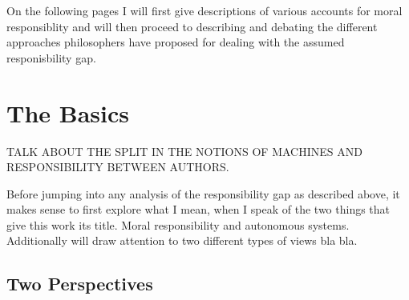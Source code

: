 \documentclass{article}
\begin{document}
On the following pages I will first give descriptions of various accounts for
moral responsiblity and will then proceed to describing and debating the
different approaches philosophers have proposed for dealing with the assumed
responisbility gap.

%
%
%
%
%
\newpage
\section{The Basics}

TALK ABOUT THE SPLIT IN THE NOTIONS OF MACHINES AND RESPONSIBILITY BETWEEN
AUTHORS.

Before jumping into any analysis of the responsibility gap as described above,
it makes sense to first explore what I mean, when I speak of the two things that
give this work its title. Moral responsibility and autonomous systems.
Additionally will draw attention to two different types of views bla bla.
\subsection{Two Perspectives}
\end{document}
